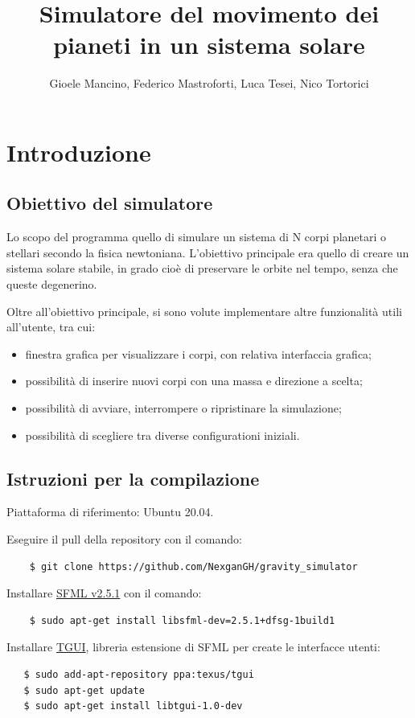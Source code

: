 \documentclass{article}
\title{Simulatore del movimento dei pianeti in un sistema solare}
\author{Gioele Mancino, Federico Mastroforti, Luca Tesei, Nico Tortorici}
\begin{document}
\maketitle
\section{Introduzione}

\subsection{Obiettivo del simulatore}
Lo scopo del programma quello di simulare un sistema di N corpi planetari o stellari secondo la fisica newtoniana. L'obiettivo principale era quello di creare un sistema solare stabile, in grado cioè di preservare le orbite nel tempo, senza che queste degenerino.

Oltre all'obiettivo principale, si sono volute implementare altre funzionalità utili all'utente, tra cui:
\begin{itemize}
    \item finestra grafica per visualizzare i corpi, con relativa interfaccia grafica;
    \item possibilità di inserire nuovi corpi con una massa e direzione a scelta;
    \item possibilità di avviare, interrompere o ripristinare la simulazione;
    \item possibilità di scegliere tra diverse configurationi iniziali.
\end{itemize}

\subsection{Istruzioni per la compilazione}

Piattaforma di riferimento: Ubuntu 20.04.

Eseguire il pull della repository con il comando:
\begin{verbatim}
    $ git clone https://github.com/NexganGH/gravity_simulator
\end{verbatim}

Installare \href{https://www.sfml-dev.org/tutorials/2.5/start-linux.php}{SFML v2.5.1} con il comando:
\begin{verbatim}
    $ sudo apt-get install libsfml-dev=2.5.1+dfsg-1build1
\end{verbatim}

Installare \href{https://www.sfml-dev.org/tutorials/2.5/start-linux.php}{TGUI}, libreria estensione di SFML per create le interfacce utenti:
\begin{verbatim}
   $ sudo add-apt-repository ppa:texus/tgui
   $ sudo apt-get update
   $ sudo apt-get install libtgui-1.0-dev
    \end{verbatim}
\end{document}
